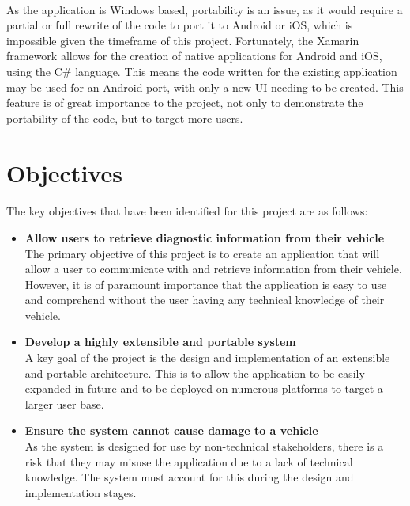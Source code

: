 	\paragraph{}{
	As the application is Windows based, portability is an issue, as it would require a partial or full rewrite of the code to port it to Android or iOS, which is impossible given the timeframe of this project. Fortunately, the Xamarin framework allows for the creation of native applications for Android and iOS, using the C{\#} language. This means the code written for the existing application may be used for an Android port, with only a new UI needing to be created. This feature is of great importance to the project, not only to demonstrate the portability of the code, but to target more users.
	}
		
\section{Objectives}
	\paragraph{}{
	The key objectives that have been identified for this project are as follows:
		\begin{itemize}
			\item \textbf{Allow users to retrieve diagnostic information from their vehicle}\\
			The primary objective of this project is to create an application that will allow a user to communicate with and retrieve information from their vehicle. However, it is of paramount importance that the application is easy to use and comprehend without the user having any technical knowledge of their vehicle.
			
			\item \textbf{Develop a highly extensible and portable system}\\
			A key goal of the project is the design and implementation of an extensible and portable architecture. This is to allow	the application to be easily expanded in future and to be deployed on numerous platforms to target a larger user base.

			\item \textbf{Ensure the system cannot cause damage to a vehicle}\\
			As the system is designed for use by non-technical stakeholders, there is a risk that they may misuse the application due to a lack of technical knowledge. The system must account for this during the design and implementation stages.
		\end{itemize}
	}
	
